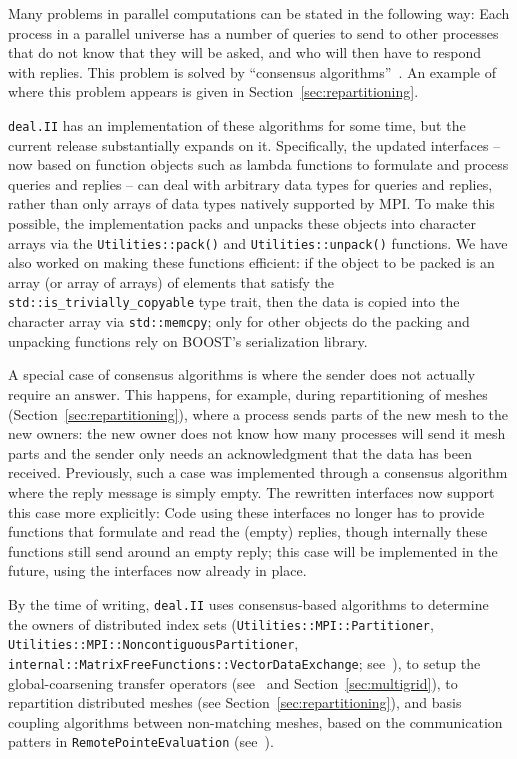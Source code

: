 \documentclass{ansarticle-preprint}
\newcommand{\specialword}[1]{\texttt{#1}}
\newcommand{\dealii}{{\specialword{deal.II}}\xspace}
\begin{document}
Many problems in parallel computations can be stated in the following
way: Each process in a parallel universe has a number of queries to
send to other processes that do not know that they will be asked, and
who will then have to respond with replies. This problem is solved by
``consensus algorithms''~\cite{hoefler2010scalable}. An example of where this problem appears is
given in Section~\ref{sec:repartitioning}.

\dealii{} has an implementation of these algorithms for some time,
but the current release substantially expands on it. Specifically, the
updated interfaces -- now based on function objects such as lambda
functions to formulate and process queries and replies -- can deal
with arbitrary data types for queries and replies, rather than only
arrays of data types natively supported by MPI. To make this possible,
the implementation packs and unpacks these objects into character
arrays via the \texttt{Utilities::pack()} and
\texttt{Utilities::unpack()} functions. We have also worked on making
these functions efficient: if the object to be packed is an array
(or array of arrays) of elements that satisfy the
\texttt{std::is\_trivially\_copyable} type trait, then the data is
copied into the character array via \texttt{std::memcpy}; only for
other objects do the packing and unpacking functions rely on BOOST's
serialization library.

A special case of consensus algorithms is where the sender does not
actually require an answer. This happens, for example, during repartitioning
of meshes (Section~\ref{sec:repartitioning}), where a process sends parts of
the new mesh to the new owners: the new owner does not know how many processes
will send it mesh parts and the sender only needs an acknowledgment that the
data has been received. Previously, such a case was implemented through a consensus
algorithm where the reply message is simply empty.
The rewritten interfaces now support this case more explicitly: Code using
these interfaces no longer has to provide functions that formulate
and read the (empty) replies, though internally these functions still
send around an empty reply; this case will be implemented in the
future, using the interfaces now already in place.

By the time of writing, \dealii uses consensus-based algorithms to determine
the owners of distributed index sets (\texttt{Utilities::MPI::Partitioner},
\texttt{Utilities::MPI::Noncontiguous\allowbreak Partitioner}, \texttt{internal::MatrixFreeFunctions::VectorDataExchange}; see~\cite{dealII91}),
to setup the global-coarsening transfer operators (see~\cite{dealII92} and
Section~\ref{sec:multigrid}), to repartition distributed meshes (see Section~\ref{sec:repartitioning}), and basis coupling algorithms between non-matching
meshes, based on the communication patters in \texttt{RemotePointeEvaluation} (see~\cite{dealII92}).
\end{document}
